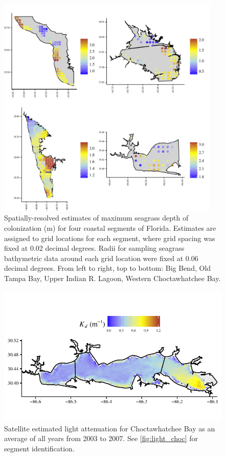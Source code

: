 \documentclass[letterpaper,12pt,oneside]{article}\usepackage[]{graphicx}\usepackage[]{color}
\begin{document}
\begin{figure}
\centering
\includegraphics[width = 0.95\textwidth]{figs/Fig4.pdf}
\caption{Spatially-resolved estimates of maximum seagrass depth of colonization (m) for four coastal segments of Florida.  Estimates are assigned to grid locations for each segment, where grid spacing was fixed at 0.02 decimal degrees.  Radii for sampling seagrass bathymetric data around each grid location were fixed at 0.06 decimal degrees. From left to right, top to bottom: Big Bend, Old Tampa Bay, Upper Indian R. Lagoon, Western Choctawhatchee Bay.}
\label{fig:all_ests}
\end{figure}


\begin{figure}
\centering
\includegraphics[width = \textwidth]{figs/Fig5.pdf}
\caption{Satellite estimated light attenuation for Choctawhatchee Bay as an average of all years from 2003 to 2007.  See \cref{fig:light_choc} for segment identification.}
\label{fig:kd_choc}
\end{figure}
\end{document}
